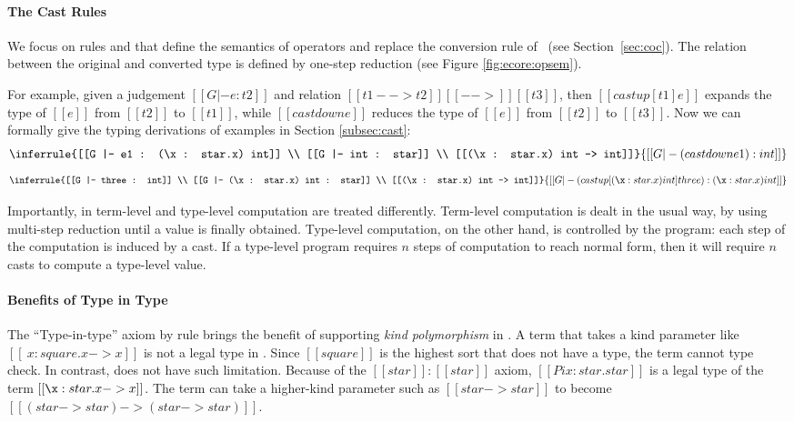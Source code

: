 \paragraph{The Cast Rules}
We focus on rules  and  that
define the semantics of \cast operators and replace the conversion
rule of \cc~(see Section~\ref{sec:coc}). The relation between the original
and converted type is defined by one-step reduction (see Figure
\ref{fig:ecore:opsem}). 

For example, given a judgement
$[[G |- e : t2]]$ and relation $[[t1 --> t2]] [[-->]] [[t3]]$, then
$[[castup [t1] e]]$ expands the type of $[[e]]$ from $[[t2]]$ to
$[[t1]]$, while $[[castdown e]]$ reduces the type of $[[e]]$ from
$[[t2]]$ to $[[t3]]$. Now we can formally give the typing derivations of 
examples in Section \ref{subsec:cast}:
\[
\inferrule{[[G |- e1 : (\x : star.x) int]] \\ [[G |- int : star]] \\ [[(\x :
star.x) int --> int]]}{[[G |- (castdown e1):int]]}
\]
\[
\inferrule{[[G |- three : int]] \\ [[G |- (\x : star.x) int : star]] \\ [[(\x :
star.x) int --> int]]}{[[G |- (castup[(\x : star.x) int] three):(\x : star.x)
int]]}
\]

Importantly, in \ecore term-level and type-level computation are treated 
differently. Term-level computation is dealt in the usual way, by 
using multi-step reduction until a value is finally obtained. 
Type-level computation, on the other hand, is controlled by the program:
each step of the computation is induced by a cast. If a type-level 
program requires $n$ steps of computation to reach normal form, 
then it will require $n$ casts to compute a type-level value.

\paragraph{Benefits of Type in Type}
The ``Type-in-type'' axiom by rule  brings the benefit 
of supporting \emph{kind polymorphism} in \ecore.
A term that takes a kind parameter like $[[\
    x:square.x->x]]$ is not a legal type in \cc. Since $[[square]]$ is
the highest sort that does not have a type, the term cannot type check.
In contrast, \ecore does not have such limitation. Because of
the $[[star]]:[[star]]$ axiom, $[[Pi x:star.star]]$ is 
a legal type of the term $[[\x:star.x->x]]$. The term can take 
a higher-kind parameter such as $[[star -> star]]$
to become $[[(star->star) -> (star -> star)]]$.

